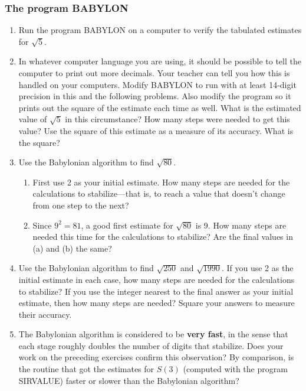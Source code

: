 \subsubsection{The program BABYLON}
\label{subsubsec:the-program-babylon}




\begin{enumerate}
\item Run the program BABYLON on a computer to verify the tabulated
 estimates for $\sqrt{5}$.


\item In whatever computer language you are using, it should be
 possible to tell the computer to print out more decimals.  Your
 teacher can tell you how this is handled on your computers.  Modify
 BABYLON to run with at least 14-digit precision in this and the
 following problems.  Also modify the program so it prints out the
 square of the estimate each time as well.  What is the estimated
 value of $\sqrt{5}$ in this circumstance?  How many steps were needed
 to get this value?  Use the square of this estimate as a measure of
 its accuracy.  What is the square?


\item Use the Babylonian algorithm to find $\sqrt{80}$.

  \begin{enumerate}
  \item First use 2 as your initial estimate.  How many steps are needed
 for the calculations to stabilize---that is, to reach a value that
 doesn't change from one step to the next?

  \item Since $9^2 = 81$, a good first estimate for $\sqrt{80}$ is 9.
  How many steps are needed this time for the calculations to
 stabilize?  Are the final values in (a) and (b) the same?


\end{enumerate}
\item Use the Babylonian algorithm to find $\sqrt{250}$ and
 $\sqrt{1990}$.  If you use 2 as the initial estimate in each case,
 how many steps are needed for the calculations to stabilize?  If you
 use the integer nearest to the final answer as your initial estimate,
 then how many steps are needed?  Square your answers to measure their
 accuracy.


\item The Babylonian algorithm is considered to be {\bf very fast}, in
 the sense that each stage roughly doubles the number of digits that
 stabilize.  Does your work on the preceding exercises confirm this
 observation?  By comparison, is the routine that got the estimates
 for $S(3)$ (computed with the program SIRVALUE) faster or slower than
 the Babylonian algorithm?


\end{enumerate}
